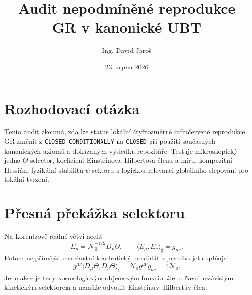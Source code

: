 \documentclass[11pt,a4paper]{article}
\title{Audit nepodmíněné reprodukce GR v kanonické UBT}
\author{Ing. David Jaro\v{s}}
\date{23. srpna 2026}
\begin{document}
\maketitle
\UBTProvenanceNotice

\section{Rozhodovací otázka}
Tento audit zkoumá, zda lze status lokální čtyřrozměrné infračervené
reprodukce GR změnit z \texttt{CLOSED\_CONDITIONALLY} na \texttt{CLOSED} při
použití současných kanonických axiomů a dokázaných výsledků repozitáře. Testuje
mikroskopický jedno-$\Theta$ selector, koeficient Einsteinova--Hilbertova členu
a míru, kompozitní Hessián, fyzikální stabilitu $\psi$-sektoru a logickou
relevanci globálního slepování pro lokální tvrzení.

\section{Přesná překážka selektoru}
Na Lorentzově reálné větvi nechť
\begin{equation}
 E_\mu=\mathcal N_0^{-1/2}D_\mu\Theta,
 \qquad \langle E_\mu,E_\nu\rangle_\sharp=g_{\mu\nu}.
\end{equation}
Potom nejpřímější kovariantní kvadratický kandidát z prvního jetu splňuje
\begin{equation}\label{eq:collapse}
 g^{\mu\nu}\langle D_\mu\Theta,D_\nu\Theta\rangle_\sharp
 =\mathcal N_0 g^{\mu\nu}g_{\mu\nu}=4\mathcal N_0.
\end{equation}
Jeho akce je tedy kosmologickým objemovým funkcionálem. Není nezávislým
kinetickým selektorem a nemůže odvodit Einsteinův--Hilbertův člen.
\end{document}
